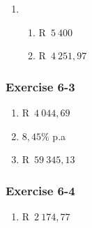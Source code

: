 {\begin{multicols}{3}
\begin{enumerate}[label=\textbf{\arabic*}.]
	\item %
	\begin{enumerate}[noitemsep, label=\textbf{(\alph*)} ]
	    \item R~$5~400$%
	    \item R~$4~251,97$%
	\end{enumerate}
    \end{enumerate}

\subsubsection*{Exercise 6-3} %

    \begin{enumerate}[label=\textbf{\arabic*}.]
	\item R~$4~044,69$%

	\item $8,45\%$ p.a%

	\item R~$59~345,13$%
    \end{enumerate}


\subsubsection*{Exercise 6-4} %

    \begin{enumerate}[label=\textbf{\arabic*}.]
	\item R~$2~174,77$%


\end{enumerate}
\end{multicols}}
